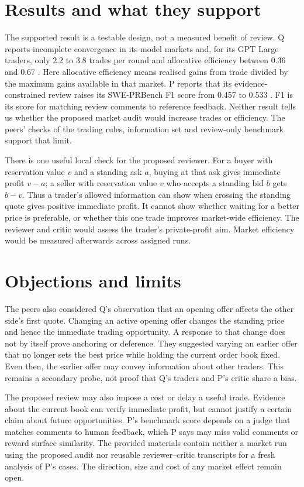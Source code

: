 \documentclass{article}
\begin{document}
\section{Results and what they support}

The supported result is a testable design, not a measured benefit of review. Q reports incomplete
convergence in its model markets and, for its GPT Large traders, only 2.2 to 3.8 trades per round
and allocative efficiency between 0.36 and 0.67 \cite{Q}. Here allocative efficiency means realised
gains from trade divided by the maximum gains available in that market. P reports that its
evidence-constrained review raises its SWE-PRBench F1 score from 0.457 to 0.533 \cite{P}. F1 is its
score for matching review comments to reference feedback. Neither result tells us whether the
proposed market audit would increase trades or efficiency. The peers' checks of the trading rules,
information set and review-only benchmark support that limit.

There is one useful local check for the proposed reviewer. For a buyer with reservation value \(v\)
and a standing ask \(a\), buying at that ask gives immediate profit \(v-a\); a seller with
reservation value \(v\) who accepts a standing bid \(b\) gets \(b-v\). Thus a trader's allowed
information can show when crossing the standing quote gives positive immediate profit. It cannot
show whether waiting for a better price is preferable, or whether this one trade improves
market-wide efficiency. The reviewer and critic would assess the trader's private-profit aim. Market
efficiency would be measured afterwards across assigned runs.

\section{Objections and limits}

The peers also considered Q's observation that an opening offer affects the other side's first
quote. Changing an active opening offer changes the standing price and hence the immediate trading
opportunity. A response to that change does not by itself prove anchoring or deference. They
suggested varying an earlier offer that no longer sets the best price while holding the current
order book fixed. Even then, the earlier offer may convey information about other traders. This
remains a secondary probe, not proof that Q's traders and P's critic share a bias.

The proposed review may also impose a cost or delay a useful trade. Evidence about the current book
can verify immediate profit, but cannot justify a certain claim about future opportunities. P's
benchmark score depends on a judge that matches comments to human feedback, which P says may miss
valid comments or reward surface similarity. The provided materials contain neither a market run
using the proposed audit nor reusable reviewer--critic transcripts for a fresh analysis of P's
cases. The direction, size and cost of any market effect remain open.
\end{document}
